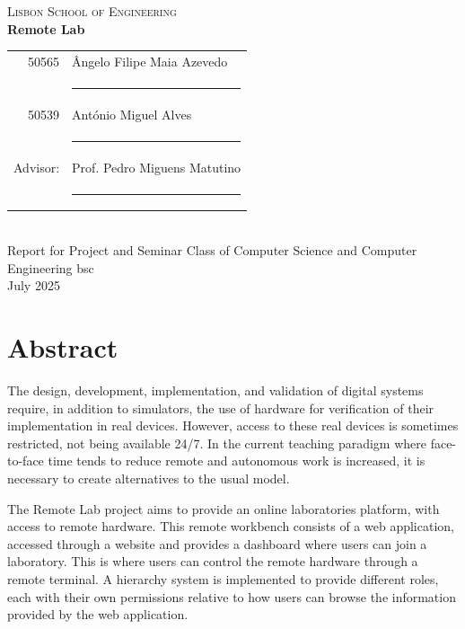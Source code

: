 \documentclass[a4paper,openright,twoside,11pt]{report}
\begin{document}
\cleardoublepage
{}
\begin{center}
\textsc{\LARGE Lisbon School of Engineering}\\[15mm]

{\Large \bf  Remote Lab}\\[20mm]

\begin{tabular}{rl}
  50565  & Ângelo Filipe Maia Azevedo\\[10mm]
           & \rule{75mm}{0.5pt}\\[5mm]

  50539  & António Miguel Alves\\[10mm]
           & \rule{75mm}{0.5pt}\\[5mm]

  Advisor: & Prof. Pedro Miguens Matutino\\[10mm]
      & \rule{75mm}{0.5pt}\\[5mm]
\end{tabular}\\[5cm]
{\large Report for Project and Seminar Class of Computer Science and Computer Engineering \acs{bsc}\\[3cm]}
July 2025\\
\end{center}

\cleardoublepage
\chapter*{Abstract}
The design, development, implementation, and validation of digital systems require, in addition 
to simulators, the use of hardware for verification of their implementation in real devices. 
However, access to these real devices is sometimes restricted, not being available 24/7. 
In the current teaching paradigm where face-to-face time tends to reduce remote and autonomous work 
is increased, it is necessary to create alternatives to the usual model.

The Remote Lab project aims to provide an online laboratories platform, with access to remote hardware.
This remote workbench consists of a web application, accessed through a website and
provides a dashboard where users can join a laboratory. This
is where users can control the remote hardware through a remote terminal. A hierarchy system is implemented to
provide different roles, each with their own permissions relative to how users can browse the
information provided by the web application.
\end{document}
